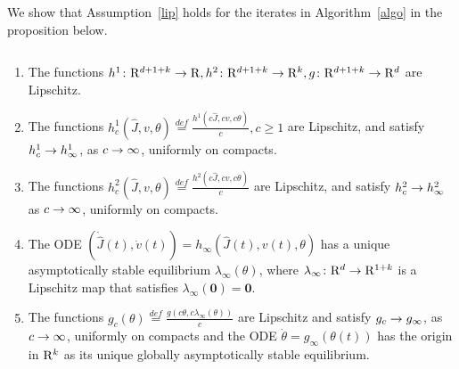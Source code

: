 We show that Assumption~\ref{lip} holds for the iterates in Algorithm~\ref{algo} in the proposition below.
\begin{proposition}
$\mbox{ }$\\
\begin{enumerate}
\item The functions $h^1\colon \mathrm{R}^{d+1+k} \rightarrow \mathrm{R}, h^2\colon \mathrm{R}^{d+1+k}\rightarrow \mathrm{R}^{k}, g\colon \mathrm{R}^{d+1+k}\rightarrow \mathrm{R}^{d}$ are Lipschitz\label{cllip}.
\item The functions $h^1_c(\hat{J},v,\theta)\stackrel{def}{=}\frac{h^1(c\hat{J},cv,c\theta)}{c}, c\geq 1$ are Lipschitz, and satisfy $h^1_c\rightarrow h^1_\infty$, as $c\rightarrow \infty$, uniformly on compacts. 
\item The functions $h^2_c(\hat{J},v,\theta)\stackrel{def}{=}\frac{h^2(c\hat{J},cv,c\theta)}{c}$ are Lipschitz, and satisfy $h^2_c \rightarrow h^2_\infty$ as $c\rightarrow \infty$, uniformly on compacts.
\item The ODE $(\dot{\hat{J}}(t),\dot{v}(t))=h_\infty(\hat{J}(t),v(t),\theta)$ has a unique asymptotically stable equilibrium $\lambda_\infty(\theta)$, where $\lambda_\infty\colon \mathrm{R}^{d} \rightarrow \mathrm{R}^{1+k}$ is a Lipschitz map that satisfies $\lambda_\infty(\mathbf{0})=\mathbf{0}$.
\item The functions $g_c(\theta)\stackrel{def}{=}\frac{g(c\theta,c\lambda_\infty(\theta))}{c}$ are Lipschitz 
and satisfy $g_c \rightarrow g_\infty$, as $c \rightarrow \infty$, uniformly on compacts and the ODE $\dot{\theta}=g_\infty(\theta(t))$ has the origin in $\mathrm{R}^k$ as its unique globally asymptotically stable equilibrium.
\end{enumerate}
\end{proposition}
